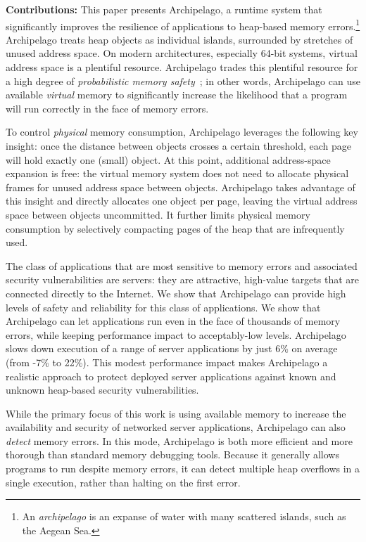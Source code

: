 \documentclass{acm_proc_article-sp}
\begin{document}
\noindent
{\bf Contributions:} This paper presents Archipelago, a runtime system
that significantly improves the resilience of applications to
heap-based memory errors.\footnote{\small An \emph{archipelago} is an
expanse of water with many scattered islands, such as the Aegean Sea.}
Archipelago treats heap objects as individual islands, surrounded by
stretches of unused address space. On modern architectures,
especially 64-bit systems, virtual address space is a plentiful
resource.  Archipelago trades this plentiful resource for a high
degree of \emph{probabilistic memory safety}~\cite{1134000}; in other
words, Archipelago can use available \emph{virtual} memory to significantly
increase the likelihood that a program will run correctly in the face
of memory errors.

To control \emph{physical} memory consumption, Archipelago leverages
the following key insight: once the distance between objects crosses a
certain threshold, each page will hold exactly one (small) object. At
this point, additional address-space expansion is free: the virtual
memory system does not need to allocate physical frames for unused
address space between objects. Archipelago takes advantage of this
insight and directly allocates one object per page, leaving the
virtual address space between objects uncommitted. It further limits
physical memory consumption by selectively compacting pages of the
heap that are infrequently used.

The class of applications that are most sensitive to memory errors and
associated security vulnerabilities are servers: they are attractive,
high-value targets that are connected directly to the Internet. We
show that Archipelago can provide high levels of safety and
reliability for this class of applications. We show that Archipelago
can let applications run even in the face of thousands of memory
errors, while keeping performance impact to acceptably-low
levels. Archipelago slows down execution of a range of server
applications by just 6\% on average (from -7\% to 22\%). This modest
performance impact makes Archipelago a realistic approach to protect
deployed server applications against known and unknown heap-based
security vulnerabilities.

While the primary focus of this work is using available memory to
increase the availability and security of networked server
applications, Archipelago can also \emph{detect} memory errors. In
this mode, Archipelago is both more efficient and more thorough than
standard memory debugging tools. Because it generally allows programs
to run despite memory errors, it can detect multiple heap overflows in
a single execution, rather than halting on the first error.
\end{document}
